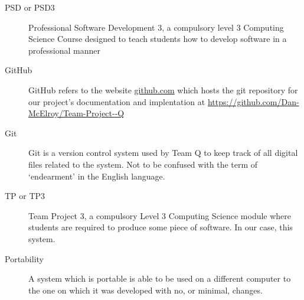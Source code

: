 \begin{description}
\item[PSD or PSD3]{Professional Software Development 3, a compulsory
    level 3 Computing Science Course designed to teach students how to
    develop software in a professional manner}
\item[GitHub] {GitHub refers to the website \url{github.com} which
    hosts the git repository for our project's documentation and
    implentation at \url{https://github.com/Dan-McElroy/Team-Project--Q}}
\item[Git] {Git is a version control system used by Team Q to keep
    track of all digital files related to the system. Not to be
    confused with the term of `endearment' in the English language.}
\item[TP or TP3] {Team Project 3, a compulsory Level 3 Computing
    Science module where students are required to produce some piece
    of software. In our case, this system.}
\item[Portability] {A system which is portable is able to be used on a
    different computer to the one on which it was developed with no,
    or minimal, changes.}
\end{description}